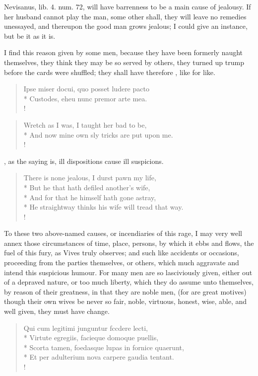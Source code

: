 Nevisanus, lib. 4. num. 72, will have barrenness to be a main
cause of jealousy. If her husband cannot play the man, some other
shall, they will leave no remedies unessayed, and thereupon the good
man grows jealous; I could give an instance, but be it as it is.

I find this reason given by some men, because they have been formerly
naught themselves, they think they may be so served by others, they
turned up trump before the cards were shuffled; they shall have
therefore , like for like.
%
\begin{latin}
\begin{verse}%
Ipse miser docui, quo posset ludere pacto\\*
Custodes, eheu nunc premor arte mea.\\!
\end{verse}%
\end{latin}
\translationrule%
\begin{verse}%
Wretch as I was, I taught her bad to be,\\*
And now mine own sly tricks are put upon me.\\!
\end{verse}%
%
%
, as the saying is, ill dispositions cause ill
suspicions.
%
\begin{verse}%
There is none jealous, I durst pawn my life,\\*
But he that hath defiled another's wife,\\*
And for that he himself hath gone astray,\\*
He straightway thinks his wife will tread that way.\\!
\end{verse}%
%

To these two above-named causes, or incendiaries of this rage, I may
very well annex those circumstances of time, place, persons, by which
it ebbs and flows, the fuel of this fury, as Vives truly
observes; and such like accidents or occasions, proceeding from the
parties themselves, or others, which much aggravate and intend this
suspicious humour. For many men are so lasciviously given, either out
of a depraved nature, or too much liberty, which they do assume unto
themselves, by reason of their greatness, in that they are noble men,
(for  are great motives)
though their own wives be never so fair, noble, virtuous, honest, wise,
able, and well given, they must have change.
%
\begin{latin}
\begin{verse}%
Qui cum legitimi junguntur fccdere lecti,\\*
Virtute egregiis, facieque domoque puellis,\\*
Scorta tamen, foedasque lupas in fornice quaerunt,\\*
Et per adulterium nova carpere gaudia tentant.\\!
\end{verse}%
\end{latin}

